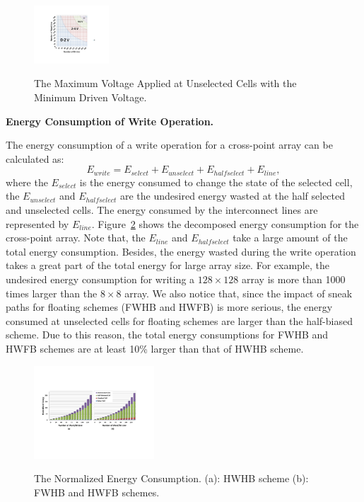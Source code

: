 \begin{figure}%
\centering
  \includegraphics[width=0.25\textwidth]{./figures/Theoretical_bound2.pdf}\\
  \caption{The Maximum Voltage Applied at Unselected Cells with the Minimum Driven Voltage.}\label{fig:half}
  \vspace{-10pt}
\end{figure}



\vspace{6pt} \textbf{Energy Consumption of Write Operation.} \vspace{6pt}

The energy consumption of a write operation for a cross-point array can be calculated as:
\begin{equation}
E_{write} = E_{select} + E_{unselect} + E_{halfselect} + E_{line},
\end{equation}
where the $E_{select}$ is the energy consumed to change the state of the
selected cell, the $E_{unselect}$ and $E_{halfselect}$ are the undesired energy wasted at the half selected and unselected cells. The energy consumed by the interconnect lines are represented by $E_{line}$. Figure~\ref{fig:energy} shows the decomposed energy consumption for the cross-point array. Note that, the $E_{line}$ and $E_{halfselect}$ take a large amount of the total energy consumption. Besides, the energy wasted during the write operation takes a great part of the total energy for large array size. For example, the undesired energy consumption for writing a $128{\times}128$ array is more than 1000 times larger than the $8{\times}8$ array. We also notice that, since the impact of sneak paths for floating schemes (FWHB and HWFB) is more serious, the energy consumed at unselected cells for floating schemes are larger than the half-biased scheme. Due to this reason, the total energy consumptions for FWHB and HWFB schemes are at least 10\% larger than that of HWHB scheme.


\begin{figure}%
\centering
  \includegraphics[width=0.40\textwidth]{./figures/energy4.pdf}\\
  \caption{The Normalized Energy Consumption. (a): HWHB scheme (b): FWHB and HWFB schemes.}\label{fig:energy}
\end{figure}

